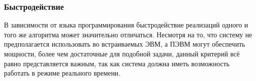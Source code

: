 \subsubsection{Быстродействие}
В зависимости от языка программирования быстродействие реализаций одного и того же алгоритма может значительно отличаться. Несмотря на то, что систему не предполагается использовать во встраиваемых ЭВМ, а ПЭВМ могут обеспечить мощности, более чем достаточные для подобной задачи, данный критерий всё равно представляется важным, так как система должна иметь возможность работать в режиме реального времени.